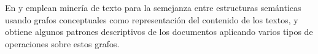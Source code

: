 En \cite{MONTESYGOMEZ2005} y \cite{munozutilizacion} emplean minería de texto para la semejanza entre estructuras semánticas
usando grafos conceptuales como representación del contenido de los textos, y obtiene algunos patrones descriptivos de los documentos aplicando varios tipos de operaciones sobre estos grafos.











